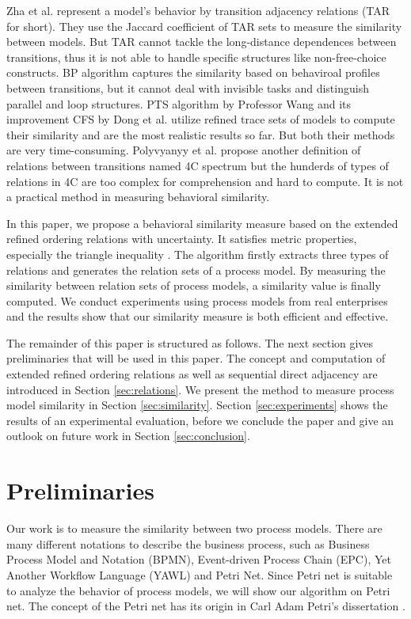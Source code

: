 \documentclass{llncs}
\begin{document}
Zha et al. \cite{zha2010workflow} represent a model's behavior by transition adjacency relations (TAR for short). They use the Jaccard coefficient of TAR sets to measure the similarity between models. But TAR cannot tackle the long-distance dependences between transitions, thus it is not able to handle specific structures like non-free-choice constructs. BP algorithm \cite{weidlich2011efficient} captures the similarity based on behaviroal profiles between transitions, but it cannot deal with invisible tasks and distinguish parallel and loop structures. PTS algorithm by Professor Wang \cite{wang2010behavioral} and its improvement CFS by Dong et al. \cite{dong2014cfs} utilize refined trace sets of models to compute their similarity and are the most realistic results so far. But both their methods are very time-consuming. Polyvyanyy et al. \cite{polyvyanyy20144c} propose another definition of relations between transitions named 4C spectrum but the hunderds of types of relations in 4C are too complex for comprehension and hard to compute. It is not a practical method in measuring behavioral similarity.

In this paper, we propose a behavioral similarity measure based on the extended refined ordering relations with uncertainty. It satisfies metric properties, especially the triangle inequality \cite{zezula2006similarity}. The algorithm firstly extracts three types of relations and generates the relation sets of a process model. By measuring the similarity between relation sets of process models, a similarity value is finally computed. We conduct experiments using process models from real enterprises and the results show that our similarity measure is both efficient and effective.

The remainder of this paper is structured as follows. The next section gives preliminaries that will be used in this paper. The concept and computation of extended refined ordering relations as well as sequential direct adjacency are introduced in Section \ref{sec:relations}. We present the method to measure process model similarity in Section \ref{sec:similarity}. Section \ref{sec:experiments} shows the results of an experimental evaluation, before we conclude the paper and give an outlook on future work in Section \ref{sec:conclusion}.

\section{Preliminaries}\label{sec:preliminaries}
Our work is to measure the similarity between two process models. There are many different notations to describe the business process, such as Business Process Model and Notation (BPMN), Event-driven Process Chain (EPC), Yet Another Workflow Language (YAWL) and Petri Net. Since Petri net is suitable to analyze the behavior of process models, we will show our algorithm on Petri net. The concept of the Petri net has its origin in Carl Adam Petri's dissertation \cite{petri1966kommunikation}.
\end{document}
